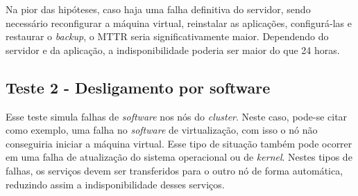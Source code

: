 Na pior das hipóteses, caso haja uma falha definitiva do servidor, sendo necessário reconfigurar a máquina virtual, reinstalar as aplicações,
configurá-las e restaurar o \textit{backup}, o \ac{MTTR} seria significativamente maior. Dependendo do servidor e da aplicação, 
a indisponibilidade poderia ser maior do que 24 horas.


% 


\subsection{Teste 2 - Desligamento por software}

Esse teste simula falhas de \textit{software} nos nós do \textit{cluster}. Neste caso, pode-se citar como exemplo, uma falha no \textit{software} 
de virtualização, com isso o nó não conseguiria iniciar a máquina virtual. Esse tipo de situação também pode ocorrer em uma falha de atualização 
do sistema operacional ou de \textit{kernel}.
Nestes tipos de falhas, os serviços devem ser transferidos para o outro nó de forma automática, reduzindo assim a indisponibilidade desses serviços. 

